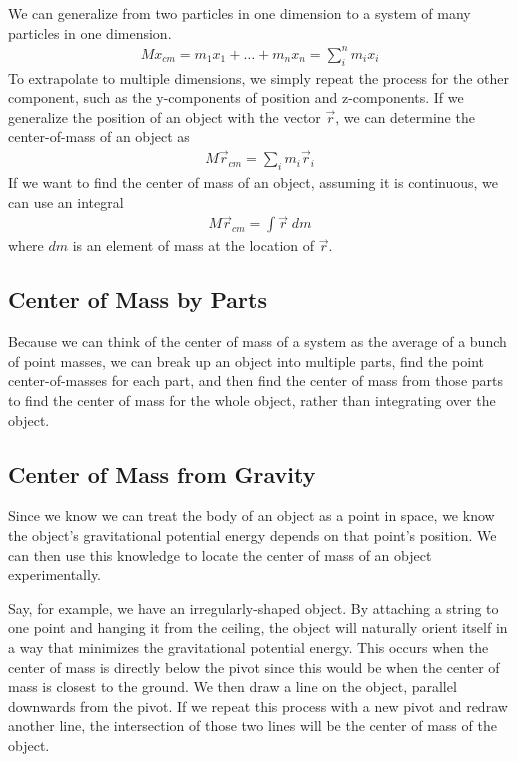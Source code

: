 \documentclass[11pt]{article}
\begin{document}
We can generalize from two particles in one dimension to a system of many particles in one dimension.
\begin{align*}
    Mx_{cm} = m_1 x_1 + \dots + m_n x_n = \sum_{i}^n m_i x_i
\end{align*}
To extrapolate to multiple dimensions, we simply repeat the process for the other component, such as the y-components of position and z-components. If we generalize the position of an object with the vector $\Vec{r}$, we can determine the center-of-mass of an object as
\begin{align*}
    M\Vec{r}_{cm} = \sum_{i} m_i \Vec{r}_i
\end{align*}
If we want to find the center of mass of an object, assuming it is continuous, we can use an integral
\begin{align*}
    M\Vec{r}_{cm} = \int \Vec{r}\;dm
\end{align*}
where $dm$ is an element of mass at the location of $\Vec{r}$.

\subsection{Center of Mass by Parts}

Because we can think of the center of mass of a system as the average of a bunch of point masses, we can break up an object into multiple parts, find the point center-of-masses for each part, and then find the center of mass from those parts to find the center of mass for the whole object, rather than integrating over the object.

\subsection{Center of Mass from Gravity}

Since we know we can treat the body of an object as a point in space, we know the object's gravitational potential energy depends on that point's position. We can then use this knowledge to locate the center of mass of an object experimentally.

Say, for example, we have an irregularly-shaped object. By attaching a string to one point and hanging it from the ceiling, the object will naturally orient itself in a way that minimizes the gravitational potential energy. This occurs when the center of mass is directly below the pivot since this would be when the center of mass is closest to the ground. We then draw a line on the object, parallel downwards from the pivot. If we repeat this process with a new pivot and redraw another line, the intersection of those two lines will be the center of mass of the object.
\end{document}

